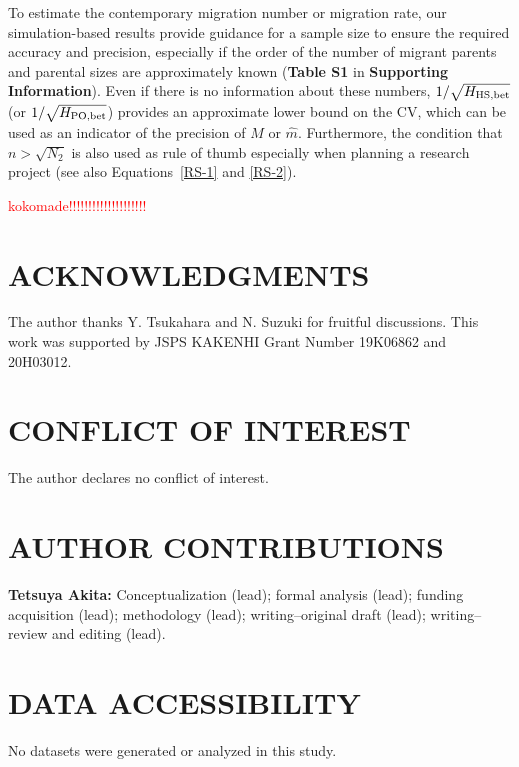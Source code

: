 \documentclass[12pt, English]{article}
\def\RED#1{\textcolor{red}{#1}} %
\begin{document}
\begin{spacing}{1.9}
To estimate the contemporary migration number or migration rate, our simulation-based results provide guidance for a sample size to ensure the required accuracy and precision, especially if the order of the number of migrant parents and parental sizes are approximately known ({\bf Table S1} in {\bf Supporting Information}). Even if there is no information about these numbers, $1/\sqrt{H_{\rm HS, bet}}$ (or $1/\sqrt{H_{\rm PO, bet}}$) provides an approximate lower bound on the CV, which can be used as an indicator of the precision of ${\hat M}$ or ${\hat m}$. Furthermore, the condition that $n>\sqrt{N_2}$ is also used as rule of thumb especially when planning a research project (see also Equations~\ref{RS-1} and \ref{RS-2}). 






\RED{kokomade!!!!!!!!!!!!!!!!!!!!}

\section*{ACKNOWLEDGMENTS}
The author thanks Y. Tsukahara and N. Suzuki for fruitful discussions. This work was supported by JSPS KAKENHI Grant Number 19K06862 and 20H03012.

\section*{CONFLICT OF INTEREST}
The author declares no conflict of interest.

\section*{AUTHOR CONTRIBUTIONS}
{\bf Tetsuya Akita:} Conceptualization (lead); formal analysis (lead); funding acquisition (lead); methodology (lead); writing--original draft (lead); writing--review and editing (lead).

\section*{DATA ACCESSIBILITY}
No datasets were generated or analyzed in this study.


\end{spacing}
\end{document}
